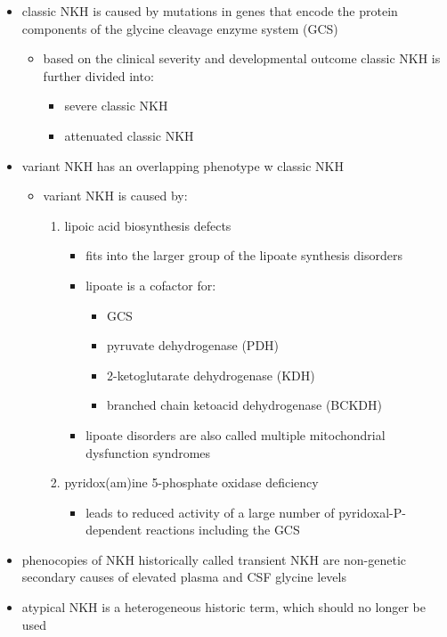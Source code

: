 \documentclass{scrartcl}
\begin{document}
\begin{itemize}
\item classic NKH is caused by mutations in genes that encode the protein
components of the glycine cleavage enzyme system (GCS)
\begin{itemize}
\item based on the clinical severity and developmental outcome classic
NKH is further divided into:
\begin{itemize}
\item severe classic NKH
\item attenuated classic NKH
\end{itemize}
\end{itemize}
\item variant NKH has an overlapping phenotype w classic NKH
\begin{itemize}
\item variant NKH is caused by: 
\begin{enumerate}
\item lipoic acid biosynthesis defects
\begin{itemize}
\item fits into the larger group of the lipoate synthesis
disorders
\item lipoate is a cofactor for:
\begin{itemize}
\item GCS
\item pyruvate dehydrogenase (PDH)
\item 2-ketoglutarate dehydrogenase (KDH)
\item branched chain ketoacid dehydrogenase (BCKDH)
\end{itemize}
\item lipoate disorders are also called multiple mitochondrial dysfunction
syndromes
\end{itemize}
\item pyridox(am)ine 5-phosphate oxidase deficiency
\begin{itemize}
\item leads to reduced activity of a large number of
pyridoxal-P-dependent reactions including the GCS
\end{itemize}
\end{enumerate}
\end{itemize}
\item phenocopies of NKH historically called transient NKH are non-genetic
secondary causes of elevated plasma and CSF glycine levels
\item atypical NKH is a heterogeneous historic term, which should no
longer be used
\end{itemize}
\end{document}
